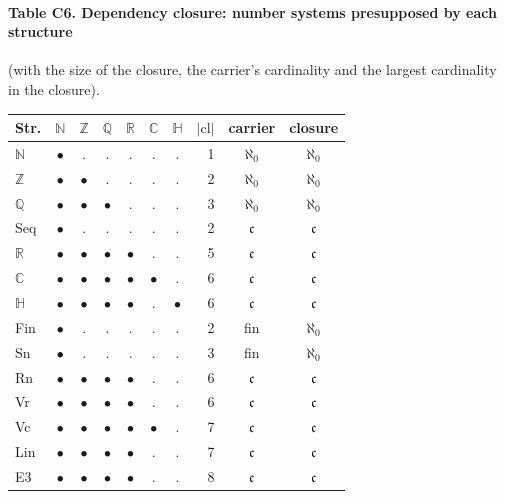 \paragraph{Table C6. Dependency closure: number systems presupposed by each structure} (with the size of the closure, the carrier's cardinality and the largest cardinality in the closure).
{\scriptsize\setlength{\tabcolsep}{3pt}
\begin{longtable}{l c c c c c c r c c}
\toprule
Str. & $\mathbb N$ & $\mathbb Z$ & $\mathbb Q$ & $\mathbb R$ & $\mathbb C$ & $\mathbb H$ & $|\mathrm{cl}|$ & carrier & closure \\
\midrule
\endhead
\bottomrule\endfoot
$\mathbb N$ & $\bullet$ & . & . & . & . & . & 1 & $\aleph_0$ & $\aleph_0$ \\
$\mathbb Z$ & $\bullet$ & $\bullet$ & . & . & . & . & 2 & $\aleph_0$ & $\aleph_0$ \\
$\mathbb Q$ & $\bullet$ & $\bullet$ & $\bullet$ & . & . & . & 3 & $\aleph_0$ & $\aleph_0$ \\
\textsf{Seq} & $\bullet$ & . & . & . & . & . & 2 & $\mathfrak c$ & $\mathfrak c$ \\
$\mathbb R$ & $\bullet$ & $\bullet$ & $\bullet$ & $\bullet$ & . & . & 5 & $\mathfrak c$ & $\mathfrak c$ \\
$\mathbb C$ & $\bullet$ & $\bullet$ & $\bullet$ & $\bullet$ & $\bullet$ & . & 6 & $\mathfrak c$ & $\mathfrak c$ \\
$\mathbb H$ & $\bullet$ & $\bullet$ & $\bullet$ & $\bullet$ & . & $\bullet$ & 6 & $\mathfrak c$ & $\mathfrak c$ \\
\textsf{Fin} & $\bullet$ & . & . & . & . & . & 2 & fin & $\aleph_0$ \\
\textsf{Sn} & $\bullet$ & . & . & . & . & . & 3 & fin & $\aleph_0$ \\
\textsf{Rn} & $\bullet$ & $\bullet$ & $\bullet$ & $\bullet$ & . & . & 6 & $\mathfrak c$ & $\mathfrak c$ \\
\textsf{Vr} & $\bullet$ & $\bullet$ & $\bullet$ & $\bullet$ & . & . & 6 & $\mathfrak c$ & $\mathfrak c$ \\
\textsf{Vc} & $\bullet$ & $\bullet$ & $\bullet$ & $\bullet$ & $\bullet$ & . & 7 & $\mathfrak c$ & $\mathfrak c$ \\
\textsf{Lin} & $\bullet$ & $\bullet$ & $\bullet$ & $\bullet$ & . & . & 7 & $\mathfrak c$ & $\mathfrak c$ \\
\textsf{E3} & $\bullet$ & $\bullet$ & $\bullet$ & $\bullet$ & . & . & 8 & $\mathfrak c$ & $\mathfrak c$ \\

\end{longtable}}
